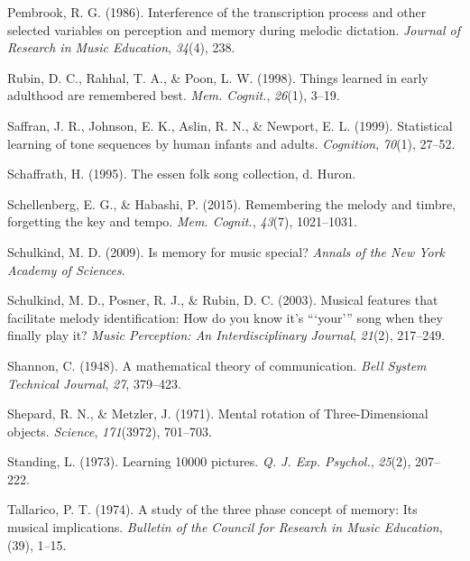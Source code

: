 \documentclass[english,man]{apa6}
\begin{document}
\leavevmode\hypertarget{ref-Pembrook1986-cg}{}%
Pembrook, R. G. (1986). Interference of the transcription process and other selected variables on perception and memory during melodic dictation. \emph{Journal of Research in Music Education}, \emph{34}(4), 238.

\leavevmode\hypertarget{ref-Rubin1998-pp}{}%
Rubin, D. C., Rahhal, T. A., \& Poon, L. W. (1998). Things learned in early adulthood are remembered best. \emph{Mem. Cognit.}, \emph{26}(1), 3--19.

\leavevmode\hypertarget{ref-Saffran1999-tn}{}%
Saffran, J. R., Johnson, E. K., Aslin, R. N., \& Newport, E. L. (1999). Statistical learning of tone sequences by human infants and adults. \emph{Cognition}, \emph{70}(1), 27--52.

\leavevmode\hypertarget{ref-Schaffrath1995-ci}{}%
Schaffrath, H. (1995). The essen folk song collection, d. Huron.

\leavevmode\hypertarget{ref-Schellenberg2015-jh}{}%
Schellenberg, E. G., \& Habashi, P. (2015). Remembering the melody and timbre, forgetting the key and tempo. \emph{Mem. Cognit.}, \emph{43}(7), 1021--1031.

\leavevmode\hypertarget{ref-Schulkind2009-xz}{}%
Schulkind, M. D. (2009). Is memory for music special? \emph{Annals of the New York Academy of Sciences}.

\leavevmode\hypertarget{ref-Schulkind2003-je}{}%
Schulkind, M. D., Posner, R. J., \& Rubin, D. C. (2003). Musical features that facilitate melody identification: How do you know it's ```your''' song when they finally play it? \emph{Music Perception: An Interdisciplinary Journal}, \emph{21}(2), 217--249.

\leavevmode\hypertarget{ref-Shannon1948-bu}{}%
Shannon, C. (1948). A mathematical theory of communication. \emph{Bell System Technical Journal}, \emph{27}, 379--423.

\leavevmode\hypertarget{ref-Shepard1971-lh}{}%
Shepard, R. N., \& Metzler, J. (1971). Mental rotation of Three-Dimensional objects. \emph{Science}, \emph{171}(3972), 701--703.

\leavevmode\hypertarget{ref-Standing1973-ou}{}%
Standing, L. (1973). Learning 10000 pictures. \emph{Q. J. Exp. Psychol.}, \emph{25}(2), 207--222.

\leavevmode\hypertarget{ref-Tallarico1974-mx}{}%
Tallarico, P. T. (1974). A study of the three phase concept of memory: Its musical implications. \emph{Bulletin of the Council for Research in Music Education}, (39), 1--15.
\end{document}
